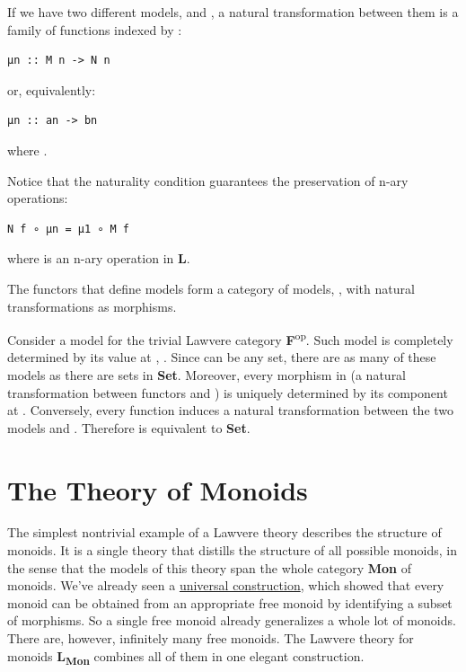 If we have two different models,  and , a natural
transformation between them is a family of functions indexed by
:

\begin{verbatim}
μn :: M n -> N n
\end{verbatim}

or, equivalently:

\begin{verbatim}
μn :: an -> bn
\end{verbatim}

where .

Notice that the naturality condition guarantees the preservation of
n-ary operations:

\begin{verbatim}
N f ∘ μn = μ1 ∘ M f
\end{verbatim}

where  is an n-ary operation in
\textbf{L}.

The functors that define models form a category of models,
, with natural transformations as morphisms.

Consider a model for the trivial Lawvere category
\textbf{F}\textsuperscript{op}. Such model is completely determined by
its value at , . Since  can be any
set, there are as many of these models as there are sets in
\textbf{Set}. Moreover, every morphism in  (a
natural transformation between functors  and ) is
uniquely determined by its component at . Conversely, every
function  induces a natural
transformation between the two models  and .
Therefore  is equivalent to \textbf{Set}.

\section{The Theory of Monoids}\label{the-theory-of-monoids}

The simplest nontrivial example of a Lawvere theory describes the
structure of monoids. It is a single theory that distills the structure
of all possible monoids, in the sense that the models of this theory
span the whole category \textbf{Mon} of monoids. We've already seen a
\href{https://bartoszmilewski.com/2015/07/21/free-monoids/}{universal
construction}, which showed that every monoid can be obtained from an
appropriate free monoid by identifying a subset of morphisms. So a
single free monoid already generalizes a whole lot of monoids. There
are, however, infinitely many free monoids. The Lawvere theory for
monoids \textbf{L\textsubscript{Mon}} combines all of them in one
elegant construction.

